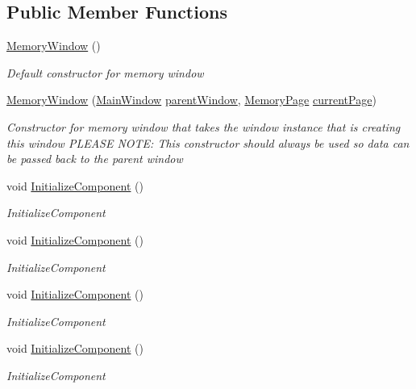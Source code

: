 \subsection*{Public Member Functions}
\begin{DoxyCompactItemize}
\item 
\hyperlink{class_c_p_u___o_s___simulator_1_1_memory_window_a9c72b7aa51f734437bd5e4aa26a230a2}{Memory\+Window} ()
\begin{DoxyCompactList}\small\item\em Default constructor for memory window \end{DoxyCompactList}\item 
\hyperlink{class_c_p_u___o_s___simulator_1_1_memory_window_a7b4208dc517300279d4cf3cd8cac6243}{Memory\+Window} (\hyperlink{class_c_p_u___o_s___simulator_1_1_main_window}{Main\+Window} \hyperlink{class_c_p_u___o_s___simulator_1_1_memory_window_afecdd32e0a0b0215d51f0630367dee3d}{parent\+Window}, \hyperlink{class_c_p_u___o_s___simulator_1_1_memory_1_1_memory_page}{Memory\+Page} \hyperlink{class_c_p_u___o_s___simulator_1_1_memory_window_ae1b974c8b976e19dde1a5491e3fe0e37}{current\+Page})
\begin{DoxyCompactList}\small\item\em Constructor for memory window that takes the window instance that is creating this window P\+L\+E\+A\+S\+E N\+O\+T\+E\+: This constructor should always be used so data can be passed back to the parent window \end{DoxyCompactList}\item 
void \hyperlink{class_c_p_u___o_s___simulator_1_1_memory_window_a40473c2b8ba30a837cf2a122e0978dec}{Initialize\+Component} ()
\begin{DoxyCompactList}\small\item\em Initialize\+Component \end{DoxyCompactList}\item 
void \hyperlink{class_c_p_u___o_s___simulator_1_1_memory_window_a40473c2b8ba30a837cf2a122e0978dec}{Initialize\+Component} ()
\begin{DoxyCompactList}\small\item\em Initialize\+Component \end{DoxyCompactList}\item 
void \hyperlink{class_c_p_u___o_s___simulator_1_1_memory_window_a40473c2b8ba30a837cf2a122e0978dec}{Initialize\+Component} ()
\begin{DoxyCompactList}\small\item\em Initialize\+Component \end{DoxyCompactList}\item 
void \hyperlink{class_c_p_u___o_s___simulator_1_1_memory_window_a40473c2b8ba30a837cf2a122e0978dec}{Initialize\+Component} ()
\begin{DoxyCompactList}\small\item\em Initialize\+Component \end{DoxyCompactList}\end{DoxyCompactItemize}
